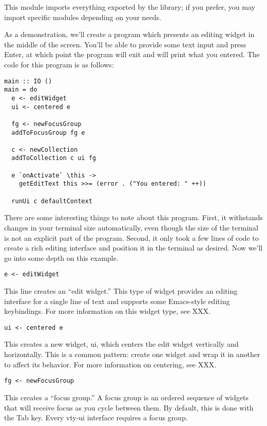 \documentclass[11pt, letterpaper, oneside, titlepage]{article}
\begin{document}
This module imports everything exported by the library; if you prefer,
you may import specific modules depending on your needs.

As a demonstration, we'll create a program which presents an editing
widget in the middle of the screen.  You'll be able to provide some
text input and press Enter, at which point the program will exit and
will print what you entered.  The code for this program is as follows:

\begin{verbatim}
main :: IO ()
main = do
  e <- editWidget
  ui <- centered e

  fg <- newFocusGroup
  addToFocusGroup fg e

  c <- newCollection
  addToCollection c ui fg

  e `onActivate` \this ->
    getEditText this >>= (error . ("You entered: " ++))

  runUi c defaultContext
\end{verbatim}

There are some interesting things to note about this program.  First,
it withstands changes in your terminal size automatically, even though
the size of the terminal is not an explicit part of the program.
Second, it only took a few lines of code to create a rich editing
interface and position it in the terminal as desired.  Now we'll go
into some depth on this example.

\begin{verbatim}
e <- editWidget
\end{verbatim}

This line creates an “edit widget.”  This type of widget provides an
editing interface for a single line of text and supports some
Emacs-style editing keybindings.  For more information on this widget
type, see XXX.

\begin{verbatim}
ui <- centered e
\end{verbatim}

This creates a new widget, ui, which centers the edit widget vertically
and horizontally.  This is a common pattern: create one widget and wrap
it in another to affect its behavior.  For more information on
centering, see XXX.

\begin{verbatim}
fg <- newFocusGroup
\end{verbatim}

This creates a “focus group.”  A focus group is an ordered sequence of
widgets that will receive focus as you cycle between them.  By default,
this is done with the Tab key.  Every vty-ui interface requires a focus
group.
\end{document}
